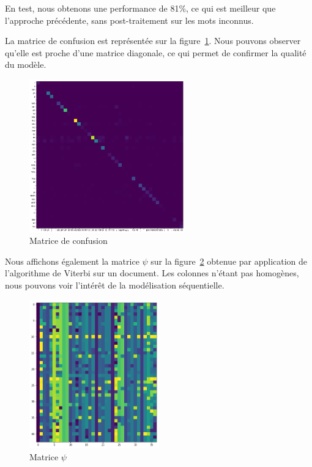 \documentclass[a4paper]{article}
\newcommand{\figref}[1]{figure~\ref{#1}}
\begin{document}
En test, nous obtenons une performance de 81\%, ce qui est meilleur que
l'approche précédente, sans post-traitement sur les mots inconnus.

La matrice de confusion est représentée sur la
\figref{img:tme1-confusion-matrix}. Nous pouvons observer qu'elle est proche
d'une matrice diagonale, ce qui permet de confirmer la qualité du modèle.

\begin{figure}[H]
	\center 
	\includegraphics[width=0.6\textwidth]{images/tme1/confusion_matrix.png}
    \caption{Matrice de confusion}
    \label{img:tme1-confusion-matrix}
\end{figure}

Nous affichons également la matrice $\psi$ sur la \figref{img:tme1-psi-matrix}
obtenue par application de l'algorithme de Viterbi sur un document. Les colonnes
n'étant pas homogènes, nous pouvons voir l'intérêt de la modélisation
séquentielle.

\begin{figure}[H]
	\center 
	\includegraphics[width=0.5\textwidth]{images/tme1/psi_matrix.png}
    \caption{Matrice $\psi$}
    \label{img:tme1-psi-matrix}
\end{figure}
\end{document}
